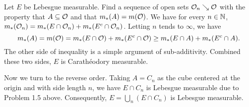 \begin{Solution}
  Let $E$ be Lebesgue measurable. Find a sequence of open sets $\mathcal{O}_n\searrow \mathcal{O}$ with the property that $A\subseteq \mathcal{O}$ and that $m_*(A)=m(\mathcal{O})$. We have for every $n\in\mathbb{N}$, $m_*(\mathcal{O}_n)=m_*(E\cap\mathcal{O}_n)+m_*(E^c\cap\mathcal{O}_n)$. Letting $n$ tends to $\infty$, we have
  $$
  m_*(A)=m(\mathcal{O})=m_*(E\cap \mathcal{O})+m_*(E^c\cap \mathcal{O})\geq m_*(E\cap A)+m_*(E^c\cap A).
  $$
  The other side of inequality is a simple argument of sub-additivity. Combined these two sides, $E$ is Carath\'eodory measurable.

  Now we turn to the reverse order. Taking $A=C_n$ as the cube centered at the origin and with side length $n$, we have $E\cap C_n$ is Lebesgue measurable due to Problem 1.5 above. Consequently, $E=\bigcup_n(E\cap C_n)$ is Lebesgue measurable.
\end{Solution}

